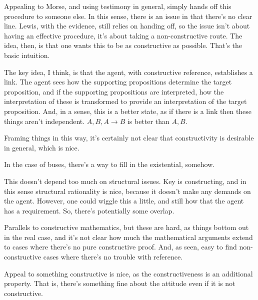 \documentclass[10pt]{article}
\begin{document}
\begin{note}
  Appealing to Morse, and using testimony in general, simply hands off this procedure to someone else.
  In this sense, there is an issue in that there's no clear line.
  Lewis, with the evidence, still relies on handing off, so the issue isn't about having an effective procedure, it's about taking a non-constructive route.
  The idea, then, is that one wants this to be as constructive as possible.
  That's the basic intuition.

  The key idea, I think, is that the agent, with constructive reference, establishes a link.
  The agent sees how the supporting propositions determine the target proposition, and if the supporting propositions are interpreted, how the interpretation of these is transformed to provide an interpretation of the target proposition.
  And, in a sense, this is a better state, as if there is a link then these things aren't independent.
  \(A, B, A \rightarrow B\) is better than \(A, B\).
\end{note}

\begin{note}
  Framing things in this way, it's certainly not clear that constructivity is desirable in general, which is nice.
\end{note}

\begin{note}
  In the case of buses, there's a way to fill in the existential, somehow.
\end{note}

\begin{note}
  This doesn't depend too much on structural issues.
  Key is constructing, and in this sense structural rationality is nice, because it doesn't make any demands on the agent.
  However, one could wiggle this a little, and still how that the agent has a requirement.
  So, there's potentially some overlap.
\end{note}

\begin{note}
  Parallels to constructive mathematics, but these are hard, as things bottom out in the real case, and it's not clear how much the mathematical arguments extend to cases where there's no pure constructive proof.
  And, as seen, easy to find non-constructive cases where there's no trouble with reference.
\end{note}

\begin{note}
  Appeal to something constructive is nice, as the constructiveness is an additional property.
  That is, there's something fine about the attitude even if it is not constructive.
\end{note}
\end{document}
